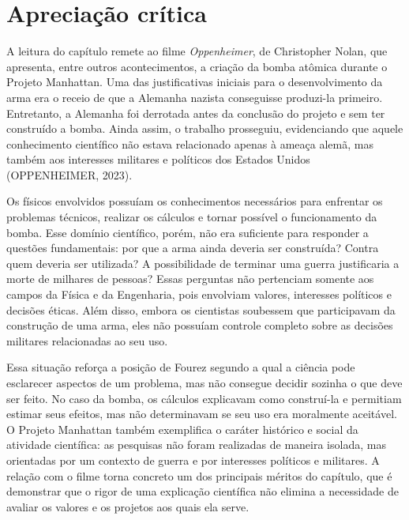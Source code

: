 \documentclass[12pt,a4paper]{article}
\begin{document}
\section*{Apreciação crítica}

A leitura do capítulo remete ao filme \textit{Oppenheimer}, de Christopher
Nolan, que apresenta, entre outros acontecimentos, a criação da bomba
atômica durante o Projeto Manhattan. Uma das justificativas iniciais para o
desenvolvimento da arma era o receio de que a Alemanha nazista conseguisse
produzi-la primeiro. Entretanto, a Alemanha foi derrotada antes da conclusão
do projeto e sem ter construído a bomba. Ainda assim, o trabalho prosseguiu,
evidenciando que aquele conhecimento científico não estava relacionado
apenas à ameaça alemã, mas também aos interesses militares e políticos dos
Estados Unidos (OPPENHEIMER, 2023).

Os físicos envolvidos possuíam os conhecimentos necessários para enfrentar
os problemas técnicos, realizar os cálculos e tornar possível o
funcionamento da bomba. Esse domínio científico, porém, não era suficiente
para responder a questões fundamentais: por que a arma ainda deveria ser
construída? Contra quem deveria ser utilizada? A possibilidade de terminar
uma guerra justificaria a morte de milhares de pessoas? Essas perguntas não
pertenciam somente aos campos da Física e da Engenharia, pois envolviam
valores, interesses políticos e decisões éticas. Além disso, embora os
cientistas soubessem que participavam da construção de uma arma, eles não
possuíam controle completo sobre as decisões militares relacionadas ao seu
uso.

Essa situação reforça a posição de Fourez segundo a qual a ciência pode
esclarecer aspectos de um problema, mas não consegue decidir sozinha o que
deve ser feito. No caso da bomba, os cálculos explicavam como construí-la e
permitiam estimar seus efeitos, mas não determinavam se seu uso era
moralmente aceitável. O Projeto Manhattan também exemplifica o caráter
histórico e social da atividade científica: as pesquisas não foram
realizadas de maneira isolada, mas orientadas por um contexto de guerra e
por interesses políticos e militares. A relação com o filme torna concreto
um dos principais méritos do capítulo, que é demonstrar que o rigor de uma
explicação científica não elimina a necessidade de avaliar os valores e os
projetos aos quais ela serve.
\end{document}
